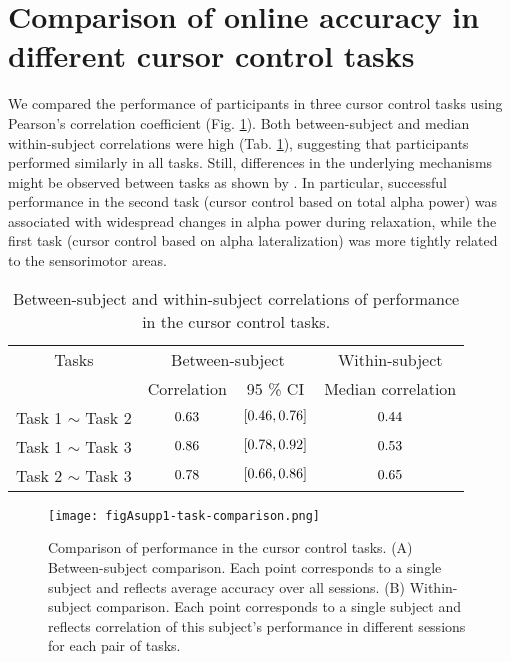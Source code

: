\section{Comparison of online accuracy in different cursor control tasks} \label{sec:task_comparison}

We compared the performance of participants in three cursor control tasks using Pearson's correlation coefficient (Fig. \ref{fig:task_comparison}). Both between-subject and median within-subject correlations were high (Tab. \ref{tab:task_comparison}), suggesting that participants performed similarly in all tasks. Still, differences in the underlying mechanisms might be observed between tasks as shown by \cite{Stieger2020_analysis}. In particular, successful performance in the second task (cursor control based on total alpha power) was associated with widespread changes in alpha power during relaxation, while the first task (cursor control based on alpha lateralization) was more tightly related to the sensorimotor areas.

\begin{table}[htbp]
    \centering
    \begin{tabular}{cccc}
        \toprule
        Tasks & \multicolumn{2}{c}{Between-subject} & Within-subject \\
        & Correlation & 95 \% CI & Median correlation\\
        \midrule
        Task 1 $\sim$ Task 2 & $0.63$ & $[0.46, 0.76]$ & $0.44$ \\
        Task 1 $\sim$ Task 3 & $0.86$ & $[0.78, 0.92]$ & $0.53$ \\
        Task 2 $\sim$ Task 3 & $0.78$ & $[0.66, 0.86]$ & $0.65$ \\
        \bottomrule
    \end{tabular}
    \caption{Between-subject and within-subject correlations of performance in the cursor control tasks.}
    \label{tab:task_comparison}
\end{table}

\begin{figure}[htbp]
    \centering
    \texttt{[image: figAsupp1-task-comparison.png]}
    \caption{Comparison of performance in the cursor control tasks. (A) Between-subject comparison. Each point corresponds to a single subject and reflects average accuracy over all sessions. (B) Within-subject comparison. Each point corresponds to a single subject and reflects correlation of this subject's performance in different sessions for each pair of tasks.}
    \label{fig:task_comparison}
\end{figure}

